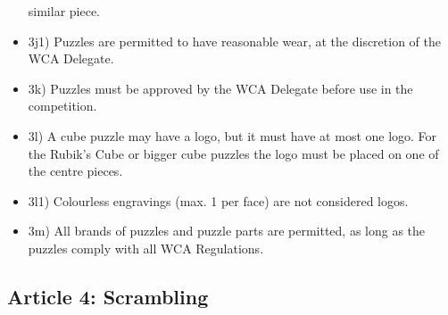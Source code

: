 \begin{itemize}
  similar piece.
\item
  3j1) Puzzles are permitted to have reasonable wear, at the discretion
  of the WCA Delegate.
\item
  3k) Puzzles must be approved by the WCA Delegate before use in the
  competition.
\item
  3l) A cube puzzle may have a logo, but it must have at most one logo.
  For the Rubik's Cube or bigger cube puzzles the logo must be placed on
  one of the centre pieces.
\item
  3l1) Colourless engravings (max. 1 per face) are not considered logos.
\item
  3m) All brands of puzzles and puzzle parts are permitted, as long as
  the puzzles comply with all WCA Regulations.
\end{itemize}

\subsection{ Article 4: Scrambling}

